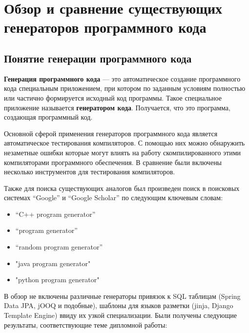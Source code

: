 \section{Обзор и сравнение существующих генераторов программного кода}

\subsection{Понятие генерации программного кода}

\textbf{Генерация программного кода} --- это автоматическое создание программного кода специальным приложением, при котором по заданным условиям полностью или частично формируется исходный код программы. Такое специальное приложение называется \textbf{генератором кода}. Получается, что это программа, создающая программный код.

Основной сферой применения генераторов программного кода является автоматическое тестирования компиляторов. 
С помощью них можно обнаружить незаметные ошибки которые могут влиять на работу скомпилированного этими компиляторами программного обеспечения. В сравнение были включены
несколько инструментов для тестирования компиляторов.

Также для поиска существующих аналогов был произведен поиск в поисковых системах “Google” и “Google Scholar”
по следующим ключевым словам:
\begin{itemize}
    \item “C++ program generator”
    \item “program generator”
    \item “random program generator”
    \item "java program generator"
    \item "python program generator"
\end{itemize}

В обзор не включены различные генераторы привязок к SQL таблицам
(Spring Data JPA, jOOQ и подобные), шаблоны для языков разметки
(jinja, Django Template Engine) ввиду их узкой специализации.
Были получены следующие результаты, соответствующие теме дипломной работы:


